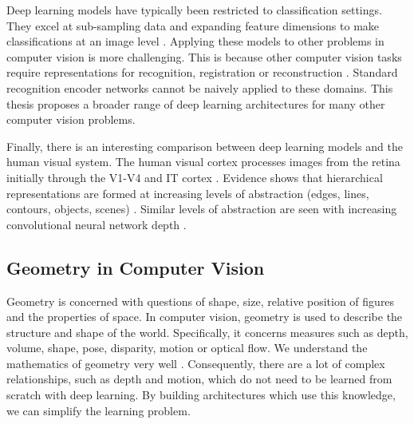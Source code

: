 Deep learning models have typically been restricted to classification settings. They excel at sub-sampling data and expanding feature dimensions to make classifications at an image level \citep{krizhevsky2012imagenet}. Applying these models to other problems in computer vision is more challenging. This is because other computer vision tasks require representations for recognition, registration or reconstruction \citep{cipolla2010computer}. Standard recognition encoder networks \citep{krizhevsky2012imagenet,simonyan2013deep,he2004multiscale} cannot be naively applied to these domains. This thesis proposes a broader range of deep learning architectures for many other computer vision problems.

Finally, there is an interesting comparison between deep learning models and the human visual system. The human visual cortex processes images from the retina initially through the V1-V4 and IT cortex \citep{hubel1962receptive}. Evidence shows that hierarchical representations are formed at increasing levels of abstraction (edges, lines, contours, objects, scenes) \citep{hubel1962receptive}. Similar levels of abstraction are seen with increasing convolutional neural network depth \citep{zeiler2014visualizing}.

\subsection{Geometry in Computer Vision}

Geometry is concerned with questions of shape, size, relative position of figures and the properties of space.
In computer vision, geometry is used to describe the structure and shape of the world. Specifically, it concerns measures such as depth, volume, shape, pose, disparity, motion or optical flow. We understand the mathematics of geometry very well \citep{koenderink1991solid,faugeras1993three,hartley2000}.
Consequently, there are a lot of complex relationships, such as depth and motion, which do not need to be learned from scratch with deep learning.
By building architectures which use this knowledge, we can simplify the learning problem.

